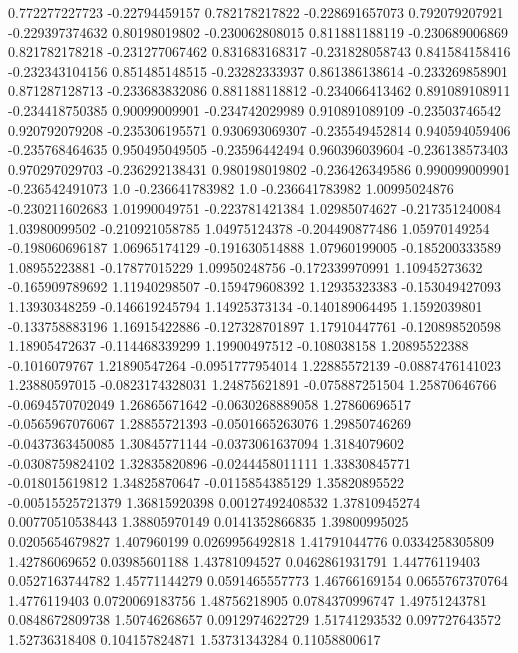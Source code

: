  0.772277227723   -0.22794459157
 0.782178217822  -0.228691657073
 0.792079207921  -0.229397374632
  0.80198019802  -0.230062808015
 0.811881188119  -0.230689006869
 0.821782178218  -0.231277067462
 0.831683168317  -0.231828058743
 0.841584158416  -0.232343104156
 0.851485148515   -0.23282333937
 0.861386138614  -0.233269858901
 0.871287128713  -0.233683832086
 0.881188118812  -0.234066413462
 0.891089108911  -0.234418750385
  0.90099009901  -0.234742029989
 0.910891089109   -0.23503746542
 0.920792079208  -0.235306195571
 0.930693069307  -0.235549452814
 0.940594059406  -0.235768464635
 0.950495049505   -0.23596442494
 0.960396039604  -0.236138573403
 0.970297029703  -0.236292138431
 0.980198019802  -0.236426349586
 0.990099009901  -0.236542491073
            1.0  -0.236641783982
            1.0  -0.236641783982
  1.00995024876  -0.230211602683
  1.01990049751  -0.223781421384
  1.02985074627  -0.217351240084
  1.03980099502  -0.210921058785
  1.04975124378  -0.204490877486
  1.05970149254  -0.198060696187
  1.06965174129  -0.191630514888
  1.07960199005  -0.185200333589
  1.08955223881   -0.17877015229
  1.09950248756  -0.172339970991
  1.10945273632  -0.165909789692
  1.11940298507  -0.159479608392
  1.12935323383  -0.153049427093
  1.13930348259  -0.146619245794
  1.14925373134  -0.140189064495
   1.1592039801  -0.133758883196
  1.16915422886  -0.127328701897
  1.17910447761  -0.120898520598
  1.18905472637  -0.114468339299
  1.19900497512     -0.108038158
  1.20895522388    -0.1016079767
  1.21890547264  -0.0951777954014
  1.22885572139  -0.0887476141023
  1.23880597015  -0.0823174328031
  1.24875621891  -0.075887251504
  1.25870646766  -0.0694570702049
  1.26865671642  -0.0630268889058
  1.27860696517  -0.0565967076067
  1.28855721393  -0.0501665263076
  1.29850746269  -0.0437363450085
  1.30845771144  -0.0373061637094
   1.3184079602  -0.0308759824102
  1.32835820896  -0.0244458011111
  1.33830845771  -0.018015619812
  1.34825870647  -0.0115854385129
  1.35820895522  -0.00515525721379
  1.36815920398  0.00127492408532
  1.37810945274  0.00770510538443
  1.38805970149  0.0141352866835
  1.39800995025  0.0205654679827
    1.407960199  0.0269956492818
  1.41791044776  0.0334258305809
  1.42786069652    0.03985601188
  1.43781094527  0.0462861931791
  1.44776119403  0.0527163744782
  1.45771144279  0.0591465557773
  1.46766169154  0.0655767370764
   1.4776119403  0.0720069183756
  1.48756218905  0.0784370996747
  1.49751243781  0.0848672809738
  1.50746268657  0.0912974622729
  1.51741293532   0.097727643572
  1.52736318408   0.104157824871
  1.53731343284    0.11058800617

